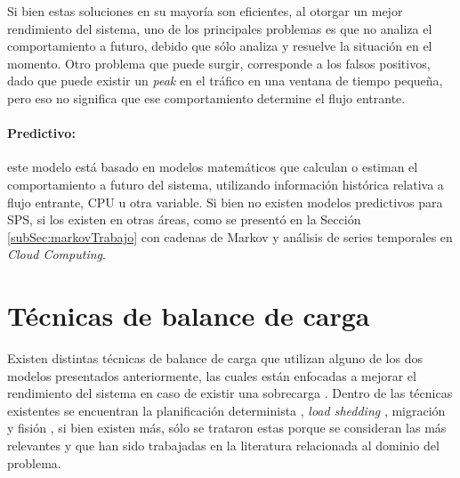 Si bien estas soluciones en su mayor\'ia son eficientes, al otorgar un mejor rendimiento del sistema, uno de los principales problemas es que no analiza el comportamiento a futuro, debido que s\'olo analiza y resuelve la situaci\'on en el momento. \normalsize{Otro problema que puede surgir, corresponde a los falsos positivos, dado que puede existir un \textit{peak} en el tr\'afico en una ventana de tiempo peque\~na, pero eso no significa que ese comportamiento determine el flujo entrante.}

\paragraph{Predictivo:} este modelo est\'a basado en modelos matem\'aticos que calculan o estiman el comportamiento a futuro del sistema, utilizando informaci\'on hist\'orica relativa a flujo entrante, CPU u otra variable. Si bien no existen modelos predictivos para SPS, si los existen en otras \'areas, como se present\'o en la Secci\'on \ref{subSec:markovTrabajo} con cadenas de Markov y an\'alisis de series temporales en \textit{Cloud Computing}.

\section{T\'ecnicas de balance de carga}
\label{sec:tecnicasBC}

Existen distintas t\'ecnicas de balance de carga que utilizan alguno de los dos modelos presentados anteriormente, las cuales est\'an enfocadas a mejorar el rendimiento del sistema en caso de existir una sobrecarga \citep{HirzelSSGG13}. Dentro de las t\'ecnicas existentes se encuentran la planificaci\'on determinista \citep{XuCTS14, DongTS07}, \textit{load shedding} \citep{SheuC09}, migraci\'on \citep{XingZH05} y fisi\'on \citep{GulisanoJPSV12, IshiiS11, GedikSHW14, FernandezMKP13}, si bien existen m\'as, s\'olo se trataron estas porque se consideran las m\'as relevantes y que han sido trabajadas en la literatura relacionada al dominio del problema.

